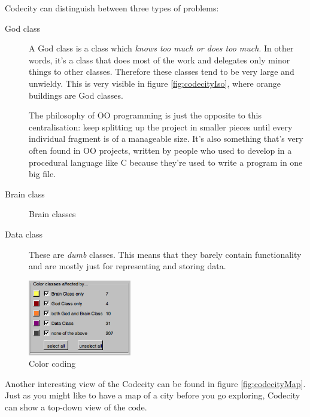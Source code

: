 \documentclass[pdftex12pt, a4paper]{article}
\begin{document}
Codecity can distinguish between three types of problems:
\begin{description}
\item[God class] A God class is a class which \emph{knows too much or does too much}. In other words, it's a class that does most of the work and delegates only minor things to other classes. Therefore these classes tend to be very large and unwieldy. This is very visible in figure \ref{fig:codecityIso}, where orange buildings are God classes.

The philosophy of OO programming is just the opposite to this centralisation: keep splitting up the project in smaller pieces until every individual fragment is of a manageable size. It's also something that's very often found in OO projects, written by people who used to develop in a procedural language like C because they're used to write a program in one big file.

\item[Brain class] Brain classes 

\item[Data class] These are \emph{dumb} classes. This means that they barely contain functionality and are mostly just for representing and storing data.

\end{description}

\begin{figure}
\begin{center}
\includegraphics[width=0.4\textwidth]{Image/Codecity/Codecity4.png}
\caption{Color coding}
\label{fig:legendCodeCity}
\end{center}
\end{figure}

Another interesting view of the Codecity can be found in figure \ref{fig:codecityMap}. Just as you might like to have a map of a city before you go exploring, Codecity can show a top-down view of the code.
\end{document}
